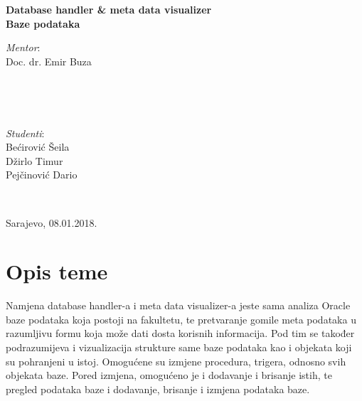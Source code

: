 \documentclass[12pt, a4paper]{report}
\theoremstyle{definition}
\begin{document}
\begin{titlepage}
{		
		\begin{center}
		\LARGE 
		\bfseries 
		Database handler \& meta data visualizer \\[0.5cm]
		
		
		\LARGE
		Baze podataka \\[4cm]
		
		\end{center}		 		

		
		\begin{minipage}{0.45\textwidth}
			\begin{flushleft}
				\emph{Mentor}: \\
				Doc. dr. Emir Buza \\
			\end{flushleft}
		\end{minipage}
		~
		\begin{minipage}{0.04\textwidth}
			\begin{flushleft}
				
			\end{flushleft}
		\end{minipage}
		~
		\begin{minipage}{0.45\textwidth}
			\begin{flushright}
				\emph{Studenti}: \\
				Bećirović Šeila\\
				Džirlo Timur\\
				Pejčinović Dario
			\end{flushright}
		\end{minipage}\\[0.7 cm]
		
		\begin{center}
			{\large Sarajevo, 08.01.2018.}\\[1cm] 
		\end{center}
		\normalsize
		
		\vfill 
	}
\end{titlepage}
\renewcommand{\chaptermark}[1]{\markboth{#1}{}}
\lhead{}

\newpage
\begin{spacing}{0.9}
	\tableofcontents
\end{spacing}
\chapter{Opis teme}

Namjena database handler-a i meta data visualizer-a jeste sama analiza Oracle baze podataka koja postoji na fakultetu, te pretvaranje gomile meta podataka u razumljivu formu koja može dati dosta korisnih informacija. Pod tim se također podrazumijeva i vizualizacija strukture same baze podataka kao i objekata koji su pohranjeni u istoj. Omogućene su izmjene procedura, trigera, odnosno svih objekata baze. Pored izmjena, omogućeno je i dodavanje i brisanje istih, te pregled podataka baze i dodavanje, brisanje i izmjena podataka baze.
\end{document}
